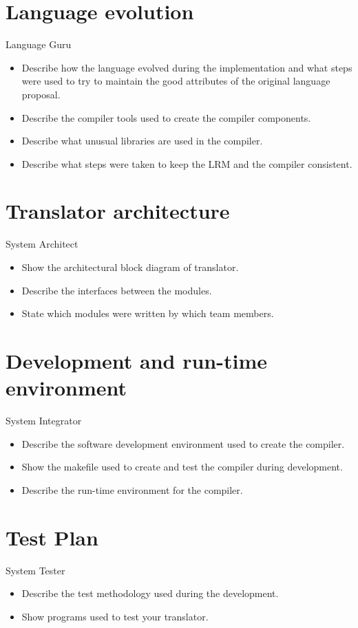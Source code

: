 \documentclass[11pt]{article}
\begin{document}
\section{Language evolution}
Language Guru
\begin{itemize}
\item Describe how the language evolved during the implementation and what steps were used to try to maintain the good attributes of the original language proposal.
\item Describe the compiler tools used to create the compiler components.
\item Describe what unusual libraries are used in the compiler.
\item Describe what steps were taken to keep the LRM and the compiler consistent.
\end{itemize}

\section{Translator architecture}
System Architect
\begin{itemize}
\item Show the architectural block diagram of translator.
\item Describe the interfaces between the modules.
\item State which modules were written by which team members.
\end{itemize}

\section{Development and run-time environment}
System Integrator
\begin{itemize}
\item Describe the software development environment used to create the compiler.
\item Show the makefile used to create and test the compiler during development.
\item Describe the run-time environment for the compiler.
\end{itemize}

\section{Test Plan}
System Tester
\begin{itemize}
\item Describe the test methodology used during the development.
\item Show programs used to test your translator.
\end{itemize}
\end{document}
